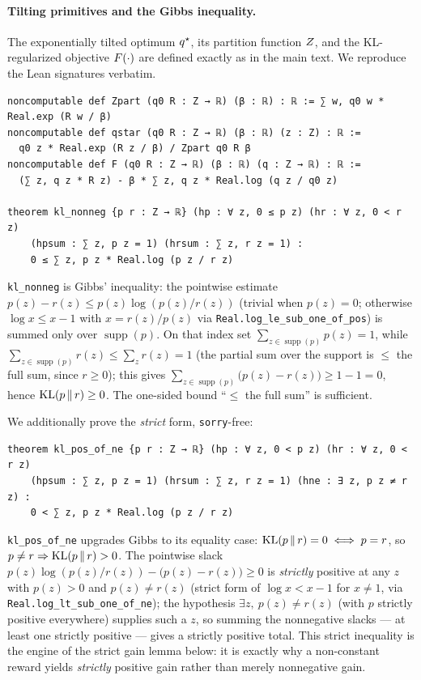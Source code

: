 \paragraph{Tilting primitives and the Gibbs inequality.}
The exponentially tilted optimum $q^{\star}$, its partition function $Z$, and the KL-regularized
objective $F\!\left(\cdot\right)$ are defined exactly as in the main text. We reproduce the Lean signatures
verbatim.

\begin{verbatim}
noncomputable def Zpart (q0 R : Z → ℝ) (β : ℝ) : ℝ := ∑ w, q0 w * Real.exp (R w / β)
noncomputable def qstar (q0 R : Z → ℝ) (β : ℝ) (z : Z) : ℝ :=
  q0 z * Real.exp (R z / β) / Zpart q0 R β
noncomputable def F (q0 R : Z → ℝ) (β : ℝ) (q : Z → ℝ) : ℝ :=
  (∑ z, q z * R z) - β * ∑ z, q z * Real.log (q z / q0 z)

theorem kl_nonneg {p r : Z → ℝ} (hp : ∀ z, 0 ≤ p z) (hr : ∀ z, 0 < r z)
    (hpsum : ∑ z, p z = 1) (hrsum : ∑ z, r z = 1) :
    0 ≤ ∑ z, p z * Real.log (p z / r z)
\end{verbatim}

\noindent
\texttt{kl\_nonneg} is Gibbs' inequality: the pointwise estimate $p(z)-r(z)\le p(z)\log(p(z)/r(z))$
(trivial when $p(z)=0$; otherwise $\log x \le x-1$ with $x=r(z)/p(z)$ via
\texttt{Real.log\_le\_sub\_one\_of\_pos}) is summed only over $\operatorname{supp}(p)$. On that index
set $\sum_{z\in\operatorname{supp}(p)} p(z)=1$, while $\sum_{z\in\operatorname{supp}(p)} r(z)\le
\sum_z r(z)=1$ (the partial sum over the support is $\le$ the full sum, since $r\ge 0$); this gives
$\sum_{z\in\operatorname{supp}(p)}\big(p(z)-r(z)\big)\ge 1-1=0$, hence $\mathrm{KL}\!\left(p \,\|\, r\right)\ge 0$. The one-sided
bound ``$\le$ the full sum'' is sufficient.

We additionally prove the \emph{strict} form, \texttt{sorry}-free:

\begin{verbatim}
theorem kl_pos_of_ne {p r : Z → ℝ} (hp : ∀ z, 0 < p z) (hr : ∀ z, 0 < r z)
    (hpsum : ∑ z, p z = 1) (hrsum : ∑ z, r z = 1) (hne : ∃ z, p z ≠ r z) :
    0 < ∑ z, p z * Real.log (p z / r z)
\end{verbatim}

\noindent
\texttt{kl\_pos\_of\_ne} upgrades Gibbs to its equality case: $\mathrm{KL}\!\left(p \,\|\, r\right)=0\iff p=r$, so
$p\ne r\Rightarrow\mathrm{KL}\!\left(p \,\|\, r\right)>0$. The pointwise slack $p(z)\log(p(z)/r(z))-\big(p(z)-r(z)\big)\ge 0$ is
\emph{strictly} positive at any $z$ with $p(z)>0$ and $p(z)\ne r(z)$ (strict form of $\log x<x-1$ for
$x\ne 1$, via \texttt{Real.log\_lt\_sub\_one\_of\_ne}); the hypothesis $\exists z,\ p(z)\ne r(z)$
(with $p$ strictly positive everywhere) supplies such a $z$, so summing the nonnegative slacks --- at
least one strictly positive --- gives a strictly positive total. This strict inequality is the engine
of the strict gain lemma below: it is exactly why a non-constant reward yields \emph{strictly}
positive gain rather than merely nonnegative gain.

